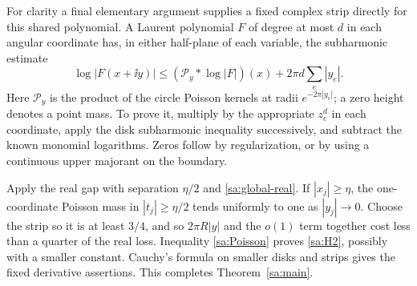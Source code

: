 For clarity a final elementary argument supplies a fixed complex strip
directly for this shared polynomial. A Laurent polynomial $F$ of
degree at most $d$ in each angular coordinate has, in either
half-plane of each variable, the subharmonic estimate
\begin{equation}\label{sa:Poisson}
 \log|F(x+\ii y)|\le
 (\mathcal P_y*\log|F|)(x)+2\pi d\sum_e|y_e|.
\end{equation}
Here $\mathcal P_y$ is the product of the circle Poisson kernels
at radii $e^{-2\pi|y_e|}$; a zero height denotes a point mass.
To prove it, multiply by the appropriate $z_e^d$ in each coordinate,
apply the disk subharmonic inequality successively, and subtract the
known monomial logarithms. Zeros follow by regularization, or by
using a continuous upper majorant on the boundary.

Apply the real gap with separation $\eta/2$ and
\eqref{sa:global-real}. If $|x_j|\ge\eta$, the one-coordinate
Poisson mass in $|t_j|\ge\eta/2$ tends uniformly to one as
$|y_j|\to0$. Choose the strip so it is at least $3/4$, and so
$2\pi R|y|$ and the $o(1)$ term together cost less than a quarter
of the real loss. Inequality \eqref{sa:Poisson} proves
\eqref{sa:H2}, possibly with a smaller constant. Cauchy's formula on
smaller disks and strips gives the fixed derivative assertions.
This completes Theorem~\ref{sa:main}.

